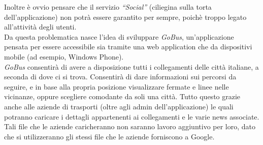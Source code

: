Inoltre è ovvio pensare che il servizio \emph{``Social''} (ciliegina sulla torta  dell'applicazione) non potrà essere garantito per sempre, poichè troppo legato all'attività degli utenti.\\
Da questa problematica nasce l’idea di sviluppare \emph{GoBus}, un’applicazione pensata per essere accessibile sia tramite una web application che da dispositivi mobile (ad esempio, Windows Phone).\\
\emph{GoBus} consentirà di avere a disposizione tutti i collegamenti delle citt\`{a} italiane, a seconda di dove ci si trova. Consentirà di dare informazioni sui percorsi da seguire, e in base alla propria posizione visualizzare fermate e linee nelle vicinanze, oppure scegliere comodante da soli una citt\`{a}.
Tutto questo grazie anche alle aziende di trasporti (oltre agli admin dell’applicazione) le quali potranno caricare i dettagli appartenenti ai collegamenti e le varie news associate. Tali file che le aziende caricheranno non saranno lavoro aggiuntivo per loro, dato che si utilizzeranno gli stessi file che le aziende forniscono a Google.